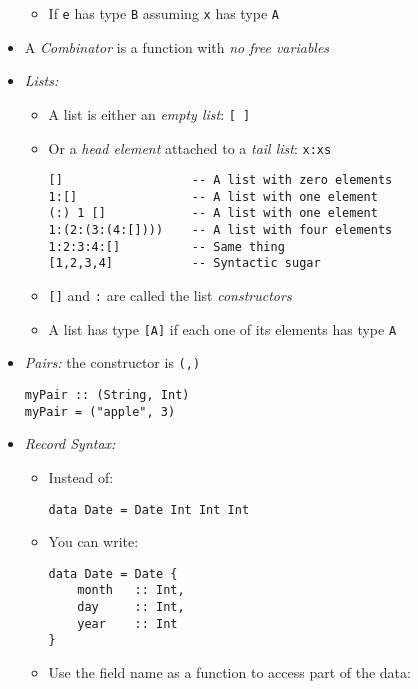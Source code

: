 \documentclass[landscape,8pt]{extarticle}
\newcommand{\code}{\lstinline}
\begin{document}
\begin{multicols}{3}
\begin{itemize}
\begin{itemize}
                  \item If \code{e} has type \code{B} assuming \code{x} has type \code{A}
              \end{itemize}
        \item A \emph{Combinator} is a function with \emph{no free variables}
        \item \emph{Lists:}
              \begin{itemize}
                  \item A list is either an \emph{empty list}: \code{[ ]}
                  \item Or a \emph{head element} attached to a \emph{tail list}: \code{x:xs}
                        \begin{lstlisting}
[]                  -- A list with zero elements
1:[]                -- A list with one element
(:) 1 []            -- A list with one element
1:(2:(3:(4:[])))    -- A list with four elements
1:2:3:4:[]          -- Same thing
[1,2,3,4]           -- Syntactic sugar
               \end{lstlisting}
                  \item \code{[]} and \code{:} are called the list \emph{constructors}
                  \item A list has type \code{[A]} if each one of its elements has type \code{A}
              \end{itemize}
        \item \emph{Pairs:} the constructor is \code{(,)}
              \begin{lstlisting}
myPair :: (String, Int)
myPair = ("apple", 3)
               \end{lstlisting}
        \item \emph{Record Syntax:}
              \begin{itemize}
                  \item Instead of:
                        \begin{lstlisting}
data Date = Date Int Int Int
               \end{lstlisting}
                  \item You can write:
                        \begin{lstlisting}
data Date = Date {
    month   :: Int,
    day     :: Int,
    year    :: Int
}
               \end{lstlisting}
                  \item Use the field name as a function to access part of the data:
                        \begin{lstlisting}

\end{lstlisting}
\end{itemize}
\end{itemize}
\end{multicols}
\end{document}
